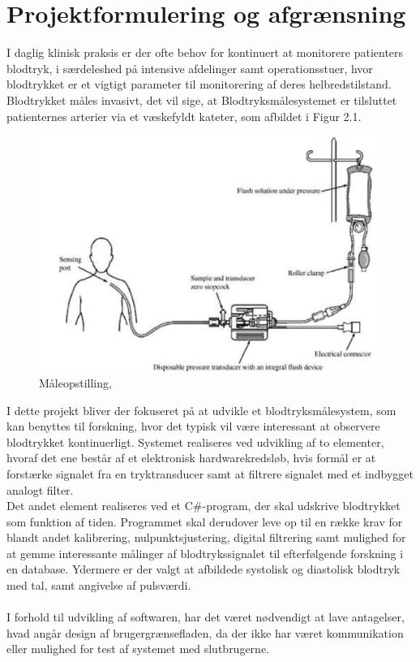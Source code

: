\chapter{Projektformulering og afgrænsning}
I daglig klinisk praksis er der ofte behov for kontinuert at monitorere patienters blodtryk, i særdeleshed på intensive afdelinger samt operationsstuer, hvor blodtrykket er et vigtigt parameter til monitorering af deres helbredstilstand. \\
Blodtrykket måles invasivt, det vil sige, at Blodtryksmålesystemet er tilsluttet patienternes arterier via et væskefyldt kateter, som afbildet i Figur 2.1.
\begin{figure}[H]
	\centering
	\includegraphics[width=1\textwidth]{Figurer/Snip20151207_50}
	\caption{Måleopstilling, \protect\cite[s. 296]{Billed for invasiv blodtryksmaling}}
\end{figure}

I dette projekt bliver der fokuseret på at udvikle et blodtryksmålesystem, som kan benyttes til forskning, hvor det typisk vil være interessant at observere blodtrykket kontinuerligt.
Systemet realiseres ved udvikling af to elementer, hvoraf det ene består af et elektronisk hardwarekredsløb, hvis formål er at forstærke signalet fra en tryktransducer samt at filtrere signalet med et indbygget analogt filter.\\
Det andet element realiseres ved et C\#-program, der skal udskrive blodtrykket som funktion af tiden. Programmet skal derudover leve op til en række krav for blandt andet kalibrering, nulpunktsjustering, digital filtrering samt mulighed for at gemme interessante målinger af blodtrykssignalet til efterfølgende forskning i en database.
Ydermere er der valgt at afbildede systolisk og diastolisk blodtryk med tal, samt angivelse af pulsværdi.\\\\
I forhold til udvikling af softwaren, har det været nødvendigt at lave antagelser, hvad angår design af brugergrænsefladen, da der ikke har været kommunikation eller mulighed for test af systemet med slutbrugerne.
\\\\ 

